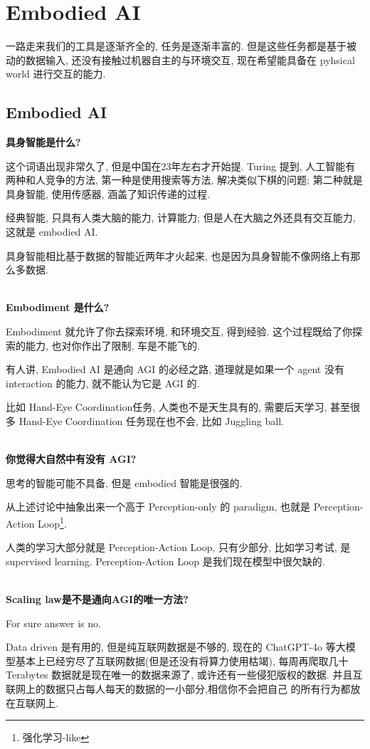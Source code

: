 \section{Embodied AI}

一路走来我们的工具是逐渐齐全的, 任务是逐渐丰富的. 但是这些任务都是基于被动的数据输入,
还没有接触过机器自主的与环境交互, 现在希望能具备在 pyhsical world 进行交互的能力.

\subsection{Embodied AI}

\textbf{具身智能是什么?}

这个词语出现非常久了, 但是中国在23年左右才开始提.
Turing 提到, 人工智能有两种和人竞争的方法, 第一种是使用搜索等方法, 解决类似下棋的问题; 
第二种就是具身智能, 使用传感器, 涵盖了知识传递的过程.

经典智能, 只具有人类大脑的能力, 计算能力; 但是人在大脑之外还具有交互能力, 这就是 embodied AI.

具身智能相比基于数据的智能近两年才火起来, 也是因为具身智能不像网络上有那么多数据.

\textbf{\\Embodiment 是什么?}

Embodiment 就允许了你去探索环境, 和环境交互, 得到经验. 
这个过程既给了你探索的能力, 也对你作出了限制, 车是不能飞的.

有人讲, Embodied AI 是通向 AGI 的必经之路, 道理就是如果一个 agent 没有interaction 的能力,
就不能认为它是 AGI 的.

比如 Hand-Eye Coordination任务, 人类也不是天生具有的, 需要后天学习, 甚至很多
Hand-Eye Coordination 任务现在也不会, 比如 Juggling ball.

\textbf{\\你觉得大自然中有没有 AGI? }

思考的智能可能不具备, 但是 embodied 智能是很强的.

从上述讨论中抽象出来一个高于 Perception-only 的 paradigm, 
也就是 Perception-Action Loop\footnote{强化学习-like}.

人类的学习大部分就是 Perception-Action Loop, 只有少部分, 比如学习考试, 是 supervised learning.
Perception-Action Loop 是我们现在模型中很欠缺的.

\textbf{\\Scaling law是不是通向AGI的唯一方法?}

For sure answer is no. 

Data driven 是有用的, 但是纯互联网数据是不够的, 现在的
ChatGPT-4o 等大模型基本上已经穷尽了互联网数据(但是还没有将算力使用枯竭), 
每周再爬取几十 Terabytes 数据就是现在唯一的数据来源了,
或许还有一些侵犯版权的数据. 并且互联网上的数据只占每人每天的数据的一小部分,相信你不会把自己
的所有行为都放在互联网上.

